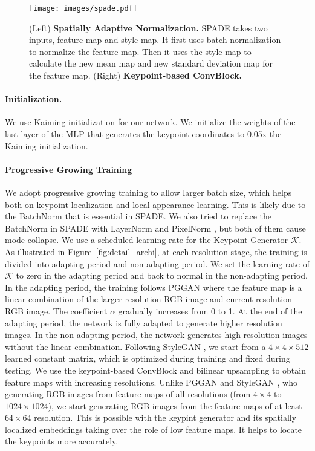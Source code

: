 \documentclass[10pt, conference, compsocconf]{IEEEtran}
\newcommand{\cK}{\mathcal K}
\begin{document}
\begin{figure}[h]
\begin{center}
   \texttt{[image: images/spade.pdf]}
\end{center}
   \caption{(Left) \textbf{Spatially Adaptive Normalization.} SPADE takes two inputs, feature map and style map. It first uses batch normalization to normalize the feature map. Then it uses the style map to calculate the new mean map and new standard deviation map for the feature map. (Right) \textbf{Keypoint-based ConvBlock.} }
\label{fig:spade}
\end{figure}

\paragraph{Initialization.} We use Kaiming initialization \cite{he2015delving} for our network. We initialize the weights of the last layer of the MLP that generates the keypoint coordinates to 0.05x the Kaiming initialization.

\paragraph{Progressive Growing Training} We adopt progressive growing training \cite{karras2018progressive} to allow larger batch size, which helps both on keypoint localization and local appearance learning. This is likely due to the BatchNorm that is essential in SPADE. We also tried to replace the BatchNorm in SPADE with LayerNorm \cite{ba2016layer} and PixelNorm \cite{karras2019style}, but both of them cause mode collapse. We use a scheduled learning rate for the Keypoint Generator $\cK$. As illustrated in Figure~\ref{fig:detail_archi}, at each resolution stage, the training is divided into adapting period and non-adapting period. We set the learning rate of $\cK$ to zero in the adapting period and back to normal in the non-adapting period. In the adapting period, the training follows PGGAN \cite{karras2018progressive} where the feature map is a linear combination of the larger resolution RGB image and current resolution RGB image. The coefficient $\alpha$ gradually increases from 0 to 1. At the end of the adapting period, the network is fully adapted to generate higher resolution images. In the non-adapting period, the network generates high-resolution images without the linear combination. Following StyleGAN \cite{karras2019style}, we start from a $4\times 4\times 512$ learned constant matrix, which is optimized during training and fixed during testing. We use the keypoint-based ConvBlock and bilinear upsampling to obtain feature maps with increasing resolutions. Unlike PGGAN \cite{karras2018progressive} and StyleGAN \cite{karras2019style}, who generating RGB images from feature maps of all resolutions (from $4\times4$ to $1024\times 1024$), we start generating RGB images from the feature maps of at least $64\times 64$ resolution. This is possible with the keypint generator and its spatially localized embeddings taking over the role of low feature maps. It helps to locate the keypoints more accurately.
\end{document}
